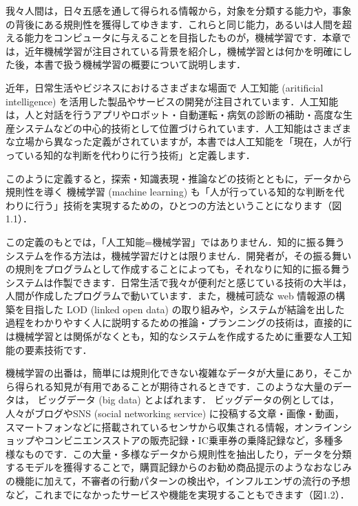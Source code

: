
我々人間は，日々五感を通して得られる情報から，対象を分類する能力や，事象の背後にある規則性を獲得してゆきます．これらと同じ能力，あるいは人間を超える能力をコンピュータに与えることを目指したものが，機械学習です．本章では，近年機械学習が注目されている背景を紹介し，機械学習とは何かを明確にした後，本書で扱う機械学習の概要について説明します．


近年，日常生活やビジネスにおけるさまざまな場面で
人工知能 (aritificial intelligence)
を活用した製品やサービスの開発が注目されています．人工知能は，人と対話を行うアプリやロボット・自動運転・病気の診断の補助・高度な生産システムなどの中心的技術として位置づけられています．人工知能はさまざまな立場から異なった定義がされていますが，本書では人工知能を「現在，人が行っている知的な判断を代わりに行う技術」と定義します．

このように定義すると，探索・知識表現・推論などの技術とともに，データから規則性を導く
機械学習 (machine learning)
も「人が行っている知的な判断を代わりに行う」技術を実現するための，ひとつの方法ということになります（図1.1）．

この定義のもとでは，「人工知能=機械学習」ではありません．知的に振る舞うシステムを作る方法は，機械学習だけとは限りません．開発者が，その振る舞いの規則をプログラムとして作成することによっても，それなりに知的に振る舞うシステムは作製できます．日常生活で我々が便利だと感じている技術の大半は，人間が作成したプログラムで動いています．また，機械可読な web 情報源の構築を目指した LOD (linked open data) の取り組みや，システムが結論を出した過程をわかりやすく人に説明するための推論・プランニングの技術は，直接的には機械学習とは関係がなくとも，知的なシステムを作成するために重要な人工知能の要素技術です．


機械学習の出番は，簡単には規則化できない複雑なデータが大量にあり，そこから得られる知見が有用であることが期待されるときです．このような大量のデータは，
ビッグデータ (big data)
とよばれます．
ビッグデータの例としては，人々がブログやSNS (social networking service) に投稿する文章・画像・動画，スマートフォンなどに搭載されているセンサから収集される情報，オンラインショップやコンビニエンスストアの販売記録・IC乗車券の乗降記録など，多種多様なものです．この大量・多様なデータから規則性を抽出したり，データを分類するモデルを獲得することで，購買記録からのお勧め商品提示のようなおなじみの機能に加えて，不審者の行動パターンの検出や，インフルエンザの流行の予想など，これまでになかったサービスや機能を実現することもできます（図1.2）．

